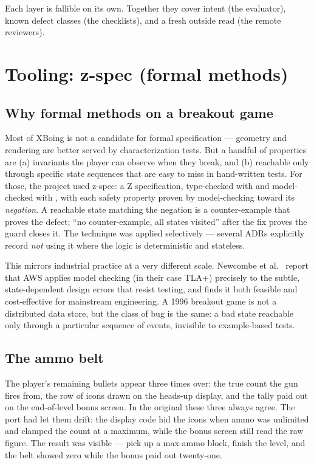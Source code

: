 \documentclass[11pt,a4paper]{article}
\begin{document}
Each layer is fallible on its own. Together they cover intent (the
evaluator), known defect classes (the checklists), and a fresh outside read
(the remote reviewers).

\section{Tooling: z-spec (formal methods)}

\subsection{Why formal methods on a breakout game}

Most of XBoing is not a candidate for formal specification --- geometry and
rendering are better served by characterization tests. But a handful of
properties are (a) invariants the player can observe when they break, and
(b) reachable only through specific state sequences that are easy to miss
in hand-written tests. For those, the project used z-spec: a Z
specification, type-checked with  and model-checked with
, with each safety property proven by model-checking toward
its \emph{negation}. A reachable state matching the negation is a
counter-example that proves the defect; ``no counter-example, all states
visited'' after the fix proves the guard closes it. The technique was
applied selectively --- several ADRs explicitly record \emph{not} using it
where the logic is deterministic and stateless.

This mirrors industrial practice at a very different scale. Newcombe et
al.\ \citep{newcombe2015} report that AWS applies model checking (in their
case TLA+) precisely to the subtle, state-dependent design errors that resist
testing, and finds it both feasible and cost-effective for mainstream
engineering. A 1996 breakout game is not a distributed data store, but the
class of bug is the same: a bad state reachable only through a particular
sequence of events, invisible to example-based tests.

\subsection{The ammo belt}

The player's remaining bullets appear three times over: the true count the
gun fires from, the row of icons drawn on the heads-up display, and the
tally paid out on the end-of-level bonus screen. In the original these three
always agree. The port had let them drift: the display code hid the icons
when ammo was unlimited and clamped the count at a maximum, while the bonus
screen still read the raw figure. The result was visible --- pick up a
max-ammo block, finish the level, and the belt showed zero while the bonus
paid out twenty-one.
\end{document}
